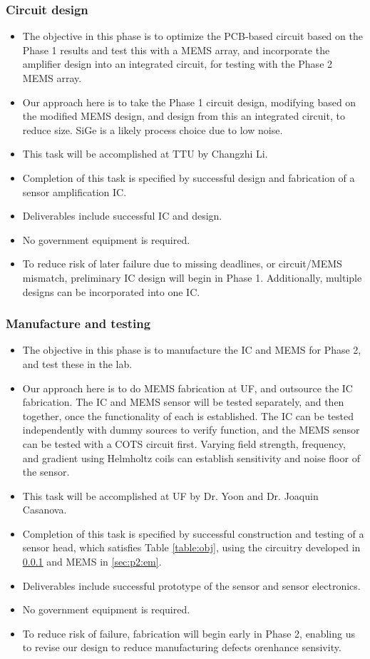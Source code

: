 \subsubsection{Circuit design}\label{sec:p2:cir}
\begin{itemize}
\item The objective in this phase is to optimize the PCB-based circuit based on the Phase 1 results and test this with a MEMS array, and incorporate the amplifier design into an integrated circuit, for testing with the Phase 2 MEMS array.
\item Our approach here is to take the Phase 1 circuit design, modifying based on the modified MEMS design, and design from this an integrated circuit, to reduce size. SiGe is a likely process choice due to low noise.
\item This task will be accomplished at TTU by Changzhi Li.
\item Completion of this task is specified by successful design and fabrication of a sensor amplification IC.
\item Deliverables include successful IC and design.
\item No government equipment is required.
\item To reduce risk of later failure due to missing deadlines, or circuit/MEMS mismatch, preliminary IC design will begin in Phase 1. Additionally, multiple designs can be incorporated into one IC.
\end{itemize}  
\subsubsection{Manufacture and testing}\label{sec:p2:test}
\begin{itemize}
\item The objective in this phase is to manufacture the IC and MEMS for Phase 2, and test these in the lab.
\item Our approach here is to do MEMS fabrication at UF, and outsource the IC fabrication. The IC and MEMS sensor will be tested separately, and then together, once the functionality of each is established. The IC can be tested independently with dummy sources to verify function, and the MEMS sensor can be tested with a COTS circuit first. Varying field strength, frequency, and gradient using Helmholtz coils can establish sensitivity and noise floor of the sensor.
\item This task will be accomplished at UF by Dr. Yoon and Dr. Joaquin Casanova.
\item Completion of this task is specified by successful construction and testing of a sensor head, which satisfies Table \ref{table:obj}, using the circuitry developed in \ref{sec:p2:cir} and MEMS in \ref{sec:p2:em}.
\item Deliverables include successful prototype of the sensor and sensor electronics.
\item No government equipment is required.
\item To reduce risk of failure, fabrication will begin early in Phase 2, enabling us to revise our design to reduce manufacturing defects orenhance sensivity.
\end{itemize}


